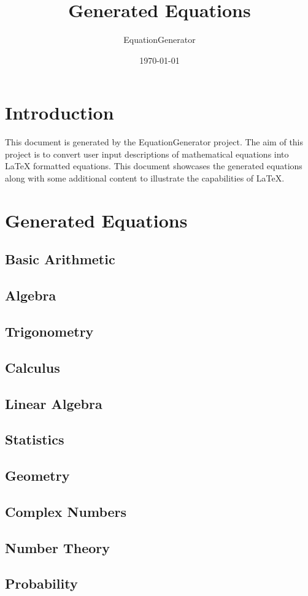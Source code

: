 \documentclass{article}
\begin{document}
\title{Generated Equations}
\author{EquationGenerator}
\date{\today}
\maketitle

\tableofcontents
\newpage

\section{Introduction}
This document is generated by the EquationGenerator project. The aim of this project is to convert user input descriptions of mathematical equations into LaTeX formatted equations. This document showcases the generated equations along with some additional content to illustrate the capabilities of LaTeX.

\section{Generated Equations}

\subsection{Basic Arithmetic}


\subsection{Algebra}


\subsection{Trigonometry}


\subsection{Calculus}


\subsection{Linear Algebra}


\subsection{Statistics}


\subsection{Geometry}


\subsection{Complex Numbers}


\subsection{Number Theory}


\subsection{Probability}

\end{document}
